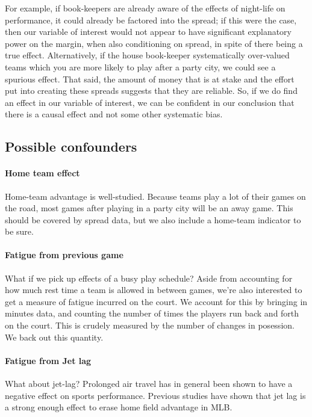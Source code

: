 \documentclass[letterpaper,12pt]{article}
\begin{document}
For example, if book-keepers
are already aware of the effects of night-life on performance, it could
already be factored into the spread; if this were the case, then our variable
of interest would not appear to have significant explanatory power
on the margin, when also conditioning on spread, in spite of there being
a true effect. Alternatively,
if the house book-keeper systematically over-valued
teams which you are more likely to play after a party city,
we could see a spurious effect.
That said, the amount of money that is at stake and the effort put into creating these spreads 
suggests that they are reliable. So, if we do find an effect in our variable of interest,
we can be confident in our conclusion that there is a causal effect and not some
other systematic bias.

\subsection{Possible confounders}

\paragraph{Home team effect}
Home-team advantage is well-studied.\cite{jones07, jones08}  
Because teams play a lot of their games on the road,
most games after playing in a party city will be an away game.
This should be covered by spread data, but we also include
a home-team indicator to be sure.

\paragraph{Fatigue from previous game}
What if we pick up effects of a busy play schedule?
Aside from accounting for how much rest time a team is allowed in between games,
we're also interested to get a measure of
fatigue incurred on the court.
We account for this by bringing in minutes data, and counting the number of 
times the players run back and forth on the court. This is crudely measured
by the number of changes in posession. We back out this quantity.

\paragraph{Fatigue from Jet lag}
What about jet-lag? Prolonged air travel has in general been shown
to have a negative effect on sports performance.\cite{leeandgalvez}
Previous studies have shown that jet lag is a strong enough effect
to erase home field advantage in MLB.\cite{songetal}
\end{document}
